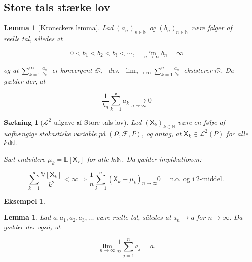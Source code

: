 \documentclass{article}
\newcommand{\1}{\mathbbm{1}}
\newcommand{\X}{\mathsf{X}}
\theoremstyle{boxed}
\newtheorem{lemma}[theorem]{Lemma}
\newtheorem{proposition}[theorem]{Sætning}
\newtheorem{example}[theorem]{Eksempel}
\begin{document}
\subsection{Store tals stærke lov}
\begin{theorem-box}
    \begin{lemma}[Kroneckers lemma]
        Lad $\left(a_n\right)_{n \in \mathbb{N}}$ og $\left(b_n\right)_{n \in \mathbb{N}}$ være følger af reelle tal, således at

$$
0<b_1<b_2<b_3<\cdots, \quad \lim _{n \rightarrow \infty} b_n=\infty
$$

og at
$\sum_{k=1}^{\infty} \frac{a_k}{b_k} \;$ er konvergent i$ \mathbb{R}, \;$ dvs. $\; \lim _{n \rightarrow \infty} \sum_{k=1}^n \frac{a_k}{b_k} \;$ eksisterer i$ \mathbb{R}$.
Da gælder der, at

$$
\frac{1}{b_n} \sum_{k=1}^n a_k \xrightarrow[n \rightarrow \infty]{ } 0
$$

    \end{lemma}
\end{theorem-box}
\begin{theorem-box}
    \begin{proposition}[$\mathcal{L}^2$-udgave af Store tals lov]
        Lad $\left(\mathsf{X}_k\right)_{k \in \mathbb{N}}$ være en følge af uafhængige stokastiske variable på $(\Omega, \mathcal{F}, P)$, og antag, at $\X_k \in \mathcal{L}^2(P)$ for alle $k i \mathbb{N}$.

        Sæt endvidere $\mu_k=\mathbb{E}\left[\mathsf{X}_k\right]$ for alle $k i \mathbb{N}$.
        Da gælder implikationen:
        
        $$
        \sum_{k=1}^{\infty} \frac{\mathbb{V}\left[\mathsf{X}_k\right]}{k^2}<\infty \Longrightarrow \frac{1}{n} \sum_{k=1}^n\left(\mathsf{X}_k-\mu_k\right) \underset{n \rightarrow \infty}{ } 0 \quad \text { n.o. og i 2-middel. }
        $$
                
    \end{proposition}
\end{theorem-box}
\begin{example}
    
\end{example}
\begin{theorem-box}
    \begin{lemma}
        Lad $a, a_1, a_2, a_3, \ldots$ være reelle tal, således at $a_n \rightarrow a$ for $n \rightarrow \infty$.
Da gælder der også, at

$$
\lim _{n \rightarrow \infty} \frac{1}{n} \sum_{j=1}^n a_j=a .
$$

    \end{lemma}
\end{theorem-box}
\end{document}

